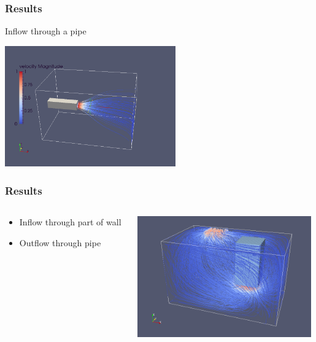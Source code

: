 \documentclass{beamer}
\begin{document}
\begin{frame}
\frametitle{Results}
Inflow through a pipe

\begin{center}
\includegraphics[height=5.2cm]{singlePipe.png}
\end{center}
\end{frame}

\begin{frame}
\frametitle{Results}
\begin{columns}
\begin{column}{0.30\textwidth}
\begin{itemize}
\item Inflow through part of wall
\item Outflow through pipe
\end{itemize}

\end{column}
\begin{column}{0.70\textwidth}
\includegraphics[height=5.2cm]{Pipe.png}
\end{column}
\end{columns}
\end{frame}
\end{document}
